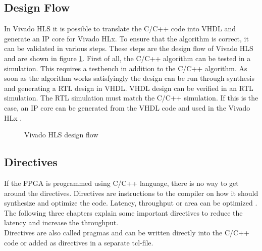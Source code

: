 \subsection{Design Flow} \label{ch:design_flow}
In Vivado HLS it is possible to translate the C/C++ code into VHDL and generate an IP core for Vivado HLx. To ensure that the algorithm is correct, it can be validated in various steps. These steps are the design flow of Vivado HLS and are shown in figure \ref{fig:hls_design_flow}.
First of all, the C/C++ algorithm can be tested in a simulation. This requires a testbench in addition to the C/C++ algorithm. As soon as the algorithm works satisfyingly the design can be run through synthesis and generating a RTL design in VHDL. VHDL design can be verified in an RTL simulation. The RTL simulation must match the C/C++ simulation. If this is the case, an IP core can be generated from the VHDL code and used in the Vivado HLx \cite{vivado_hls}.

\begin{figure}[tb!]
    \centering
    
    \caption{Vivado HLS design flow}
    \label{fig:hls_design_flow}
\end{figure}

\subsection{Directives} \label{ch:directives}
If the FPGA is programmed using C/C++ language, there is no way to get around the directives. Directives are instructions to the compiler on how it should synthesize and optimize the code. Latency, throughput or area can be optimized \cite{pragma}. The following three chapters explain some important directives to reduce the latency and increase the throughput. \\
Directives are also called pragmas and can be written directly into the C/C++ code or added as directives in a separate tcl-file.



